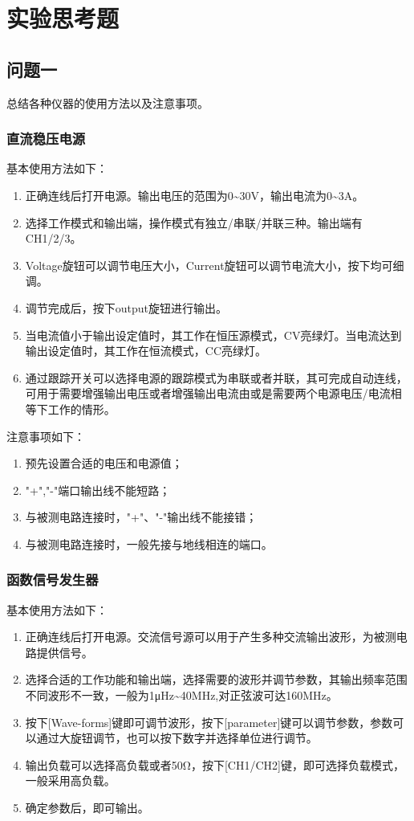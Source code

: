 \documentclass[a4paper,11pt,UTF8]{ctexart}
\begin{document}
\section{实验思考题}

\subsection{问题一}
总结各种仪器的使用方法以及注意事项。
\subsubsection{直流稳压电源}
基本使用方法如下：
\begin{enumerate}
  \item 正确连线后打开电源。输出电压的范围为0\~{}30V，输出电流为0\~{}3A。
  \item 选择工作模式和输出端，操作模式有独立/串联/并联三种。输出端有CH1/2/3。
  \item Voltage旋钮可以调节电压大小，Current旋钮可以调节电流大小，按下均可细调。
  \item 调节完成后，按下output旋钮进行输出。
  \item 当电流值小于输出设定值时，其工作在恒压源模式，CV亮绿灯。当电流达到输出设定值时，其工作在恒流模式，CC亮绿灯。
  \item 通过跟踪开关可以选择电源的跟踪模式为串联或者并联，其可完成自动连线，可用于需要增强输出电压或者增强输出电流由或是需要两个电源电压/电流相等下工作的情形。
\end{enumerate}

注意事项如下：
\begin{enumerate}
  \item 预先设置合适的电压和电源值；
  \item "+","-"端口输出线不能短路；
  \item 与被测电路连接时，"+"、"-"输出线不能接错；
  \item 与被测电路连接时，一般先接与地线相连的端口。
\end{enumerate}
\subsubsection{函数信号发生器}
基本使用方法如下：
\begin{enumerate}
  \item 正确连线后打开电源。交流信号源可以用于产生多种交流输出波形，为被测电路提供信号。
  \item 选择合适的工作功能和输出端，选择需要的波形并调节参数，其输出频率范围不同波形不一致，一般为1μHz\~{}40MHz,对正弦波可达160MHz。
  \item 按下[Wave-forms]键即可调节波形，按下[parameter]键可以调节参数，参数可以通过大旋钮调节，也可以按下数字并选择单位进行调节。
  \item 输出负载可以选择高负载或者50Ω，按下[CH1/CH2]键，即可选择负载模式，一般采用高负载。
  \item 确定参数后，即可输出。
\end{enumerate}
\end{document}
